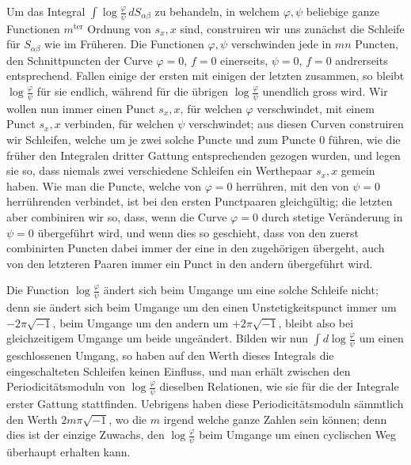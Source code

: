 \documentclass[10pt]{article}
\begin{document}
Um das Integral \(\int \log\frac{\varphi}{\psi}\,dS_{\alpha\beta}\) zu behandeln, in welchem \(\varphi,\psi\) beliebige ganze Functionen \(m^{\mathrm{ter}}\) Ordnung von \(s_x,x\) sind, construiren wir uns zunächst die Schleife für \(S_{\alpha\beta}\) wie im Früheren. Die Functionen \(\varphi,\psi\) verschwinden jede in \(mn\) Puncten, den Schnittpuncten der Curve \(\varphi=0\), \(f=0\) einerseits, \(\psi=0\), \(f=0\) andrerseits entsprechend. Fallen einige der ersten mit einigen der letzten zusammen, so bleibt \(\log\frac{\varphi}{\psi}\) für sie endlich, während für die übrigen \(\log\frac{\varphi}{\psi}\) unendlich gross wird. Wir wollen nun immer einen Punct \(s_x,x\), für welchen \(\varphi\) verschwindet, mit einem Punct \(s_x,x\) verbinden, für welchen \(\psi\) verschwindet; aus diesen Curven construiren wir Schleifen, welche um je zwei solche Puncte und zum Puncte \(0\) führen, wie die früher den Integralen dritter Gattung entsprechenden gezogen wurden, und legen sie so, dass niemals zwei verschiedene Schleifen ein Werthepaar \(s_x,x\) gemein haben. Wie man die Puncte, welche von \(\varphi=0\) herrühren, mit den von \(\psi=0\) herrührenden verbindet, ist bei den ersten Punctpaaren gleichgültig; die letzten aber combiniren wir so, dass, wenn die Curve \(\varphi=0\) durch stetige Veränderung in \(\psi=0\) übergeführt wird, und wenn dies so geschieht, dass von den zuerst combinirten Puncten dabei immer der eine in den zugehörigen übergeht, auch von den letzteren Paaren immer ein Punct in den andern übergeführt wird.

Die Function \(\log\frac{\varphi}{\psi}\) ändert sich beim Umgange um eine solche Schleife nicht; denn sie ändert sich beim Umgange um den einen Unstetigkeitspunct immer um \(-2\pi\sqrt{-1}\), beim Umgange um den andern um \(+2\pi\sqrt{-1}\), bleibt also bei gleichzeitigem Umgange um beide ungeändert. Bilden wir nun \(\int d\log\frac{\varphi}{\psi}\) um einen geschlossenen Umgang, so haben auf den Werth dieses Integrals die eingeschalteten Schleifen keinen Einfluss, und man erhält zwischen den Periodicitätsmoduln von \(\log\frac{\varphi}{\psi}\) dieselben Relationen, wie sie für die der Integrale erster Gattung stattfinden. Uebrigens haben diese Periodicitätsmoduln sämmtlich den Werth \(2m\pi\sqrt{-1}\), wo die \(m\) irgend welche ganze Zahlen sein können; denn dies ist der einzige Zuwachs, den \(\log\frac{\varphi}{\psi}\) beim Umgange um einen cyclischen Weg überhaupt erhalten kann.
\end{document}
